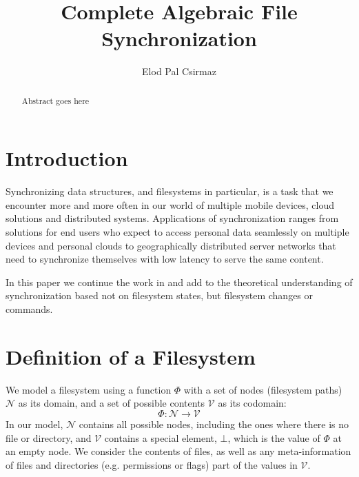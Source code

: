 \documentclass[12pt]{article}
\title{Complete Algebraic File Synchronization}
\author{Elod Pal Csirmaz}
\newcommand{\setv}{\mathcal{V}} %
\newcommand{\setn}{\mathcal{N}} %
\newcommand{\empt}{\bot}
\newcommand{\FS}{\Phi} %
\theoremstyle{definition}
\begin{document}
\maketitle
\begin{abstract}
Abstract goes here
\end{abstract}

\section{Introduction}


Synchronizing data structures, and filesystems in particular,
is a task that we encounter more and more often in our world
of multiple mobile devices, cloud solutions and distributed systems.
Applications of synchronization ranges from
solutions for end users who expect to access personal data seamlessly
on multiple devices and personal clouds to geographically distributed server networks
that need to synchronize themselves with low latency to serve the 
same content.

In this paper we
continue the work in \cite{NREC:alg} and add to the theoretical understanding
of synchronization based not on filesystem states, but filesystem changes or commands.





\section{Definition of a Filesystem}

We model a filesystem using a function $\FS$ with a set of nodes (filesystem paths) $\setn$ as its domain,
and a set of possible contents $\setv$ as its codomain:
\[ \FS : \setn \rightarrow \setv \] 
In our model, $\setn$ contains all possible nodes, including the ones where there is no file or directory,
and $\setv$ contains a special element, $\empt$, which is the value of $\FS$ at an empty node.
We consider the contents of files, as well as any meta-information of files
and directories (e.g. permissions or flags) part of the values in $\setv$.
\end{document}

